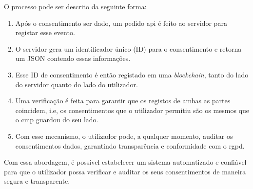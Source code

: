 O processo pode ser descrito da seguinte forma:

\begin{enumerate}
    \item Após o consentimento ser dado, um pedido \acrshort{api} é feito ao servidor para registar esse evento.
    \item O servidor gera um identificador único (ID) para o consentimento e retorna um JSON contendo essas informações.
    \item Esse ID de consentimento é então registado em uma \textit{blockchain}, tanto do lado do servidor quanto do lado do utilizador.
    \item Uma verificação é feita para garantir que os registos de ambas as partes coincidem, i.e, os consentimentos que o utilizador permitiu são os mesmos que o \acrshort{cmp} guardou do seu lado.
    \item Com esse mecanismo, o utilizador pode, a qualquer momento, auditar os consentimentos dados, garantindo transparência e conformidade com o \acrshort{rgpd}.
\end{enumerate}

Com essa abordagem, é possível estabelecer um sistema automatizado e confiável para que o utilizador possa verificar e auditar os seus consentimentos de maneira segura e transparente.
